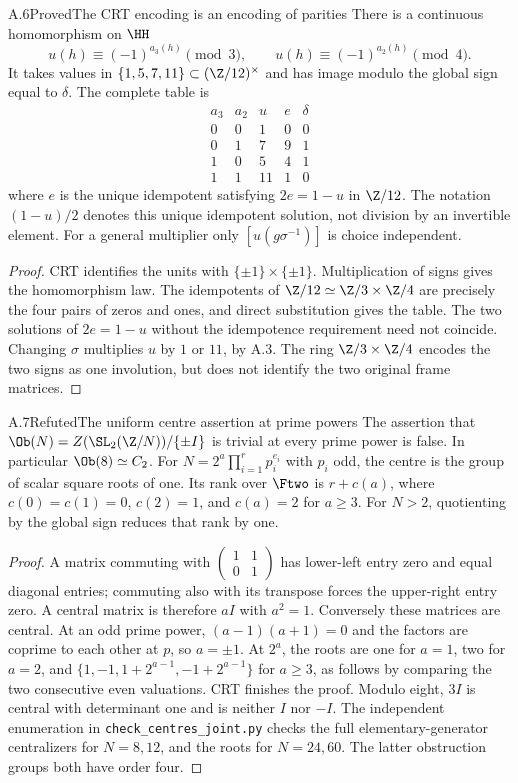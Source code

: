 \begin{statement}{A.6}{Proved}{The CRT encoding is an encoding of parities}
There is a continuous homomorphism on $\HH$
\[
 u(h)\equiv(-1)^{a_3(h)}\pmod3,\qquad
 u(h)\equiv(-1)^{a_2(h)}\pmod4.
\]
It takes values in $\{1,5,7,11\}\subset(\Z/12)^\times$ and
has image modulo the global sign equal to $\delta$.
The complete table is
\[
\begin{array}{cc|ccc}
a_3&a_2&u&e&\delta\\\hline
0&0&1&0&0\\0&1&7&9&1\\1&0&5&4&1\\1&1&11&1&0
\end{array}
\]
where $e$ is the unique idempotent satisfying $2e=1-u$ in $\Z/12$.
The notation $(1-u)/2$ denotes this unique idempotent solution,
not division by an invertible element. For a general multiplier
only $[u(g\sigma^{-1})]$ is choice independent.
\end{statement}
\begin{proof}
CRT identifies the units with $\{\pm1\}\times\{\pm1\}$.
Multiplication of signs gives the homomorphism law. The idempotents
of $\Z/12\simeq\Z/3\times\Z/4$ are precisely the four pairs of
zeros and ones, and direct substitution gives the table. The two
solutions of $2e=1-u$ without the idempotence requirement need not
coincide. Changing $\sigma$ multiplies $u$ by $1$ or $11$, by
A.3. The ring $\Z/3\times\Z/4$ encodes the two signs as one
involution, but does not identify the two original frame matrices.
\end{proof}

\begin{statement}{A.7}{Refuted}{The uniform centre assertion at prime powers}
The assertion that
$\Ob(N)=Z(\SL_2(\Z/N))/\{\pm I\}$ is trivial at every prime
power is false. In particular $\Ob(8)\simeq C_2$.
For $N=2^a\prod_{i=1}^r p_i^{e_i}$ with $p_i$ odd,
the centre is the group of scalar square roots of one. Its rank
over $\Ftwo$ is $r+c(a)$, where
$c(0)=c(1)=0$, $c(2)=1$, and $c(a)=2$ for $a\ge3$.
For $N>2$, quotienting by the global sign reduces that rank by one.
\end{statement}
\begin{proof}
A matrix commuting with
$\left(\begin{smallmatrix}1&1\\0&1\end{smallmatrix}\right)$
has lower-left entry zero and equal diagonal entries; commuting
also with its transpose forces the upper-right entry zero. A
central matrix is therefore $aI$ with $a^2=1$. Conversely these
matrices are central. At an odd prime power,
$(a-1)(a+1)=0$ and the factors are coprime to each other at $p$,
so $a=\pm1$. At $2^a$, the roots are one for $a=1$, two for
$a=2$, and $\{1,-1,1+2^{a-1},-1+2^{a-1}\}$ for $a\ge3$,
as follows by comparing the two consecutive even valuations.
CRT finishes the proof. Modulo eight, $3I$ is central with
determinant one and is neither $I$ nor $-I$. The independent
enumeration in \texttt{check\_centres\_joint.py} checks the full
elementary-generator centralizers for $N=8,12$, and the roots for
$N=24,60$. The latter obstruction groups both have order four.
\end{proof}


